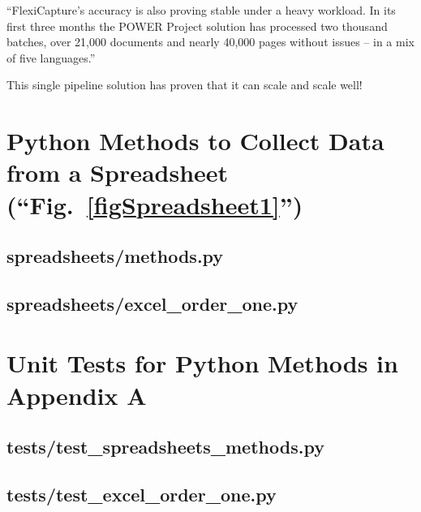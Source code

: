 \documentclass[conference]{IEEEtran}
\begin{document}
``FlexiCapture's accuracy is also proving stable under a heavy workload. In its first three months the POWER Project solution has processed two thousand batches, over 21,000 documents and nearly 40,000 pages without issues – in a mix of five languages.'' \cite{pepsico}

This single pipeline solution has proven that it can scale and scale well!




\onecolumn
\appendices

\newpage
\section{Python Methods to Collect Data from a Spreadsheet (``Fig.~\ref{figSpreadsheet1}'')}
    \subsection{spreadsheets/methods.py}
    

    \newpage
    \subsection{spreadsheets/excel\_order\_one.py}
    

\newpage
\section{Unit Tests for Python Methods in Appendix A}
    \subsection{tests/test\_spreadsheets\_methods.py}
    

    \newpage
    \subsection{tests/test\_excel\_order\_one.py}
    

% 
\end{document}
